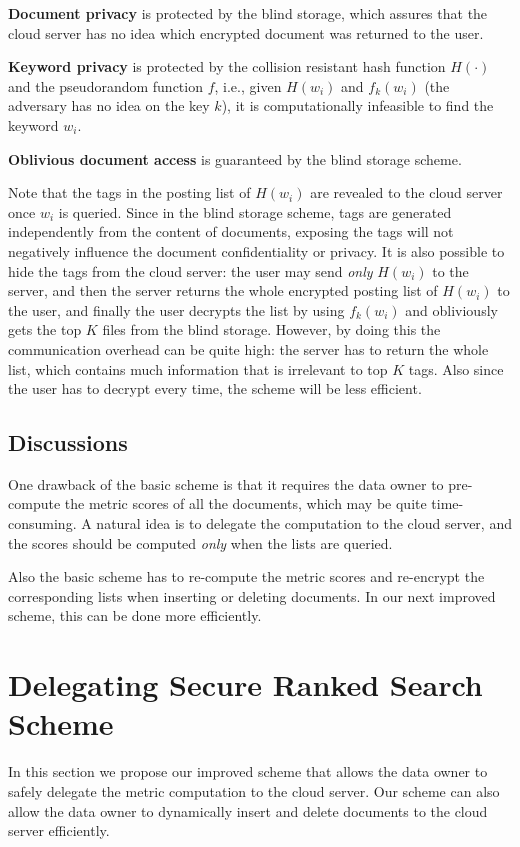 \documentclass{IEEEtran}
\begin{document}
\textbf{Document privacy} is protected by the blind storage, which assures that the cloud server has no idea which encrypted document was returned to the user. 

\textbf{Keyword privacy} is protected by the collision resistant hash function $H(\cdot)$ and the pseudorandom function $f$, i.e., given $H(w_i)$ and $f_k(w_i)$ (the adversary has no idea on the key $k$), it is computationally infeasible to find the keyword $w_i$.

\textbf{Oblivious document access} is guaranteed by the blind storage scheme.

Note that the tags in the posting list of $H(w_i)$ are revealed to the cloud server once $w_i$ is queried. Since in the blind storage scheme, tags are generated independently from the content of documents, exposing the tags will not negatively influence the document confidentiality or privacy. It is also possible to hide the tags from the cloud server: the user may send \emph{only} $H(w_i)$ to the server, and then the server returns the whole encrypted posting list of $H(w_i)$ to the user, and finally the user decrypts the list by using $f_k(w_i)$ and obliviously gets the top $K$ files from the blind storage. However, by doing this the communication overhead can be quite high: the server has to return the whole list, which contains much information that is irrelevant to top $K$ tags. Also since the user has to decrypt every time, the scheme will be less efficient.

\subsection{Discussions}
One drawback of the basic scheme is that it requires the data owner to pre-compute the metric scores of all the documents, which may be quite time-consuming. A natural idea is to delegate the computation to the cloud server, and the scores should be computed \emph{only} when the lists are queried.

Also the basic scheme has to re-compute the metric scores and re-encrypt the corresponding lists when inserting or deleting documents. In our next improved scheme, this can be done more efficiently.


\section{Delegating Secure Ranked Search Scheme}
In this section we propose our improved scheme that allows the data owner to safely delegate the metric computation to the cloud server. Our scheme can also allow the data owner to dynamically insert and delete documents to the cloud server efficiently.
\end{document}
